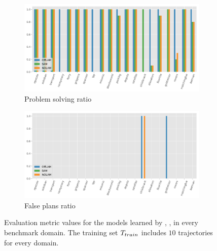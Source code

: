\begin{figure}[ht]
  \begin{subfigure}[b]{0.45\textwidth}
    \includegraphics[width=\textwidth]{figures/10_traces/solving.png}
    \caption{Problem solving ratio}
  \end{subfigure}
  \hfill
  \begin{subfigure}[b]{0.45\textwidth}
    \includegraphics[width=\textwidth]{figures/10_traces/false_plans.png}
    \caption{False plans ratio}
    \label{fig:false-positive-plans}
  \end{subfigure}

\caption{Evaluation metric values for the models learned by \sam, \offlam, \nolam in every benchmark domain. The training set $T_{train}$ includes $10$ trajectories for every domain.}
\end{figure} 